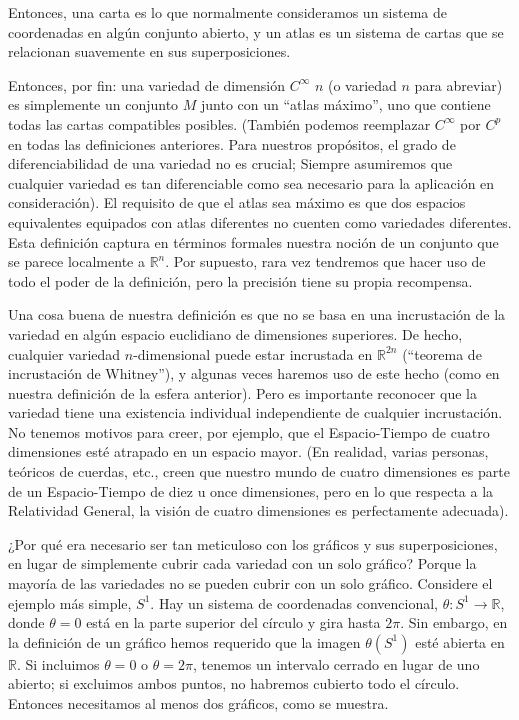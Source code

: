 \documentclass[11pt,b5paper,openany,twoside]{book}
\newcommand{\R}{\mathbb{R}}
\begin{document}
\noindent
Entonces, una carta es lo que normalmente consideramos un sistema de coordenadas en algún conjunto abierto, y un atlas es un sistema de cartas que se relacionan suavemente en sus superposiciones.

Entonces, por fin: una variedad {\bf} de dimensión $C^\infty$ $n$ (o variedad $n$ para abreviar) es simplemente un conjunto $M$ junto con un ``atlas máximo'', uno que contiene todas las cartas compatibles posibles.
(También podemos reemplazar $C^\infty$ por $C^p$ en todas las definiciones anteriores.
Para nuestros propósitos, el grado de diferenciabilidad de una variedad no es crucial; Siempre asumiremos que cualquier variedad es tan diferenciable como sea necesario para la aplicación en consideración).
El requisito de que el atlas sea máximo es que dos espacios equivalentes equipados con atlas diferentes no cuenten como variedades diferentes.
Esta definición captura en términos formales nuestra noción de un conjunto que se parece localmente a $\mathbb{R}^n$.
Por supuesto, rara vez tendremos que hacer uso de todo el poder de la definición, pero la precisión tiene su propia recompensa.

Una cosa buena de nuestra definición es que no se basa en una incrustación de la variedad en algún espacio euclidiano de dimensiones superiores.
De hecho, cualquier variedad $n$-dimensional puede estar incrustada en $\R^{2n}$ (``teorema de incrustación de Whitney''), y algunas veces haremos uso de este hecho (como en nuestra definición de la esfera anterior).
Pero es importante reconocer que la variedad tiene una existencia individual independiente de cualquier incrustación.
No tenemos motivos para creer, por ejemplo, que el Espacio-Tiempo de cuatro dimensiones esté atrapado en un espacio mayor.
(En realidad, varias personas, teóricos de cuerdas, etc., creen que nuestro mundo de cuatro dimensiones es parte de un Espacio-Tiempo de diez u once dimensiones, pero en lo que respecta a la Relatividad General, la visión de cuatro dimensiones es perfectamente adecuada).

¿Por qué era necesario ser tan meticuloso con los gráficos y sus superposiciones, en lugar de simplemente cubrir cada variedad con un solo gráfico? Porque la mayoría de las variedades no se pueden cubrir con un solo gráfico.
Considere el ejemplo más simple, $S^1$.
Hay un sistema de coordenadas convencional, $\theta: S^1\rightarrow\R$, donde $\theta=0$ está en la parte superior del círculo y gira hasta $2\pi$.
Sin embargo, en la definición de un gráfico hemos requerido que la imagen $\theta(S^1)$ esté abierta en $\R$.
Si incluimos $\theta=0$ o $\theta=2\pi$, tenemos un intervalo cerrado en lugar de uno abierto; si excluimos ambos puntos, no habremos cubierto todo el círculo.
Entonces necesitamos al menos dos gráficos, como se muestra.
\end{document}
